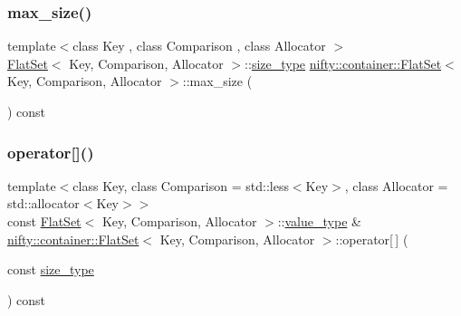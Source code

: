 \mbox{\label{classnifty_1_1container_1_1FlatSet_a9f76cdc060ea18e60d7aceb506e5eece}} 
\subsubsection{\texorpdfstring{max\+\_\+size()}{max\_size()}}
{\footnotesize\ttfamily template$<$class Key , class Comparison , class Allocator $>$ \\
\hyperlink{classnifty_1_1container_1_1FlatSet}{Flat\+Set}$<$ Key, Comparison, Allocator $>$\+::\hyperlink{classnifty_1_1container_1_1FlatSet_a06ddeba4c1be37279497ed698dfeb812}{size\+\_\+type} \hyperlink{classnifty_1_1container_1_1FlatSet}{nifty\+::container\+::\+Flat\+Set}$<$ Key, Comparison, Allocator $>$\+::max\+\_\+size (\begin{DoxyParamCaption}{ }\end{DoxyParamCaption}) const\hspace{0.3cm}{\ttfamily [inline]}}

\mbox{\label{classnifty_1_1container_1_1FlatSet_ab27d508690712397b377227cfd8341fc}} 
\subsubsection{\texorpdfstring{operator[]()}{operator[]()}}
{\footnotesize\ttfamily template$<$class Key, class Comparison = std\+::less$<$\+Key$>$, class Allocator = std\+::allocator$<$\+Key$>$$>$ \\
const \hyperlink{classnifty_1_1container_1_1FlatSet}{Flat\+Set}$<$ Key, Comparison, Allocator $>$\+::\hyperlink{classnifty_1_1container_1_1FlatSet_a2366c665ec49d585ff8a77362468d82d}{value\+\_\+type} \& \hyperlink{classnifty_1_1container_1_1FlatSet}{nifty\+::container\+::\+Flat\+Set}$<$ Key, Comparison, Allocator $>$\+::operator\mbox{[}$\,$\mbox{]} (\begin{DoxyParamCaption}\item[{const \hyperlink{classnifty_1_1container_1_1FlatSet_a06ddeba4c1be37279497ed698dfeb812}{size\+\_\+type}}]{ }\end{DoxyParamCaption}) const\hspace{0.3cm}{\ttfamily [inline]}}

